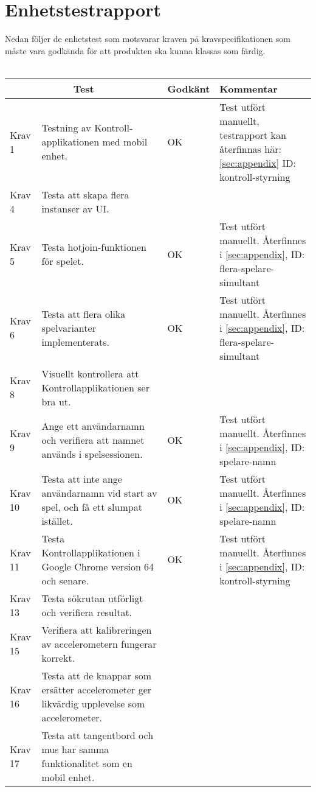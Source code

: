\documentclass[10pt]{article}
\begin{document}
\section{Enhetstestrapport}
	Nedan följer de enhetstest som motsvarar kraven på kravspecifikationen \cite{bib-kravspec} som måste vara godkända för att produkten ska kunna klassas som färdig.
\\ \\
\noindent
\begin{tabular}{| p{1.5cm} | p{5cm} | p{1.2cm}| p{7cm}|}

	\hline
	\multicolumn{2}{|c|}{Test}&{Godkänt}&{Kommentar}\\
    	\hline

		Krav 1&Testning av Kontroll-applikationen med mobil enhet.&OK&Test utfört manuellt, testrapport kan återfinnas här: \ref{sec:appendix} ID: kontroll-styrning\\
		\hline
		Krav 4& Testa att skapa flera instanser av UI.&&\\
		\hline
		Krav 5&Testa hotjoin-funktionen för spelet.& OK & Test utfört manuellt. Återfinnes i \ref{sec:appendix}, ID: flera-spelare-simultant\\
		\hline
		Krav 6&Testa att flera olika spelvarianter implementerats.& OK & Test utfört manuellt. Återfinnes i \ref{sec:appendix}, ID: flera-spelare-simultant\\
		\hline
		Krav 8&Visuellt kontrollera att Kontrollapplikationen ser bra ut.&&\\
		\hline
		Krav 9&Ange ett användarnamn och verifiera att namnet används i spelsessionen.&OK&Test utfört manuellt. Återfinnes i \ref{sec:appendix}, ID: spelare-namn\\
		\hline
		Krav 10&Testa att inte ange användarnamn vid start av spel, och få ett slumpat istället.&OK&Test utfört manuellt. Återfinnes i \ref{sec:appendix}, ID: spelare-namn\\
		\hline
		Krav 11&Testa Kontrollapplikationen i Google Chrome version 64 och senare.&OK&Test utfört manuellt. Återfinnes i \ref{sec:appendix}, ID: kontroll-styrning\\
		\hline
		Krav 13&Testa sökrutan utförligt och verifiera resultat.&& \\
		\hline
		Krav 15&Verifiera att kalibreringen av accelerometern fungerar korrekt.&&\\
		\hline
		Krav 16&Testa att de knappar som ersätter accelerometer ger likvärdig upplevelse som accelerometer.&&\\
		\hline
		Krav 17&Testa att tangentbord och mus har samma funktionalitet som en mobil enhet.&&\\

\end{tabular}
\end{document}
